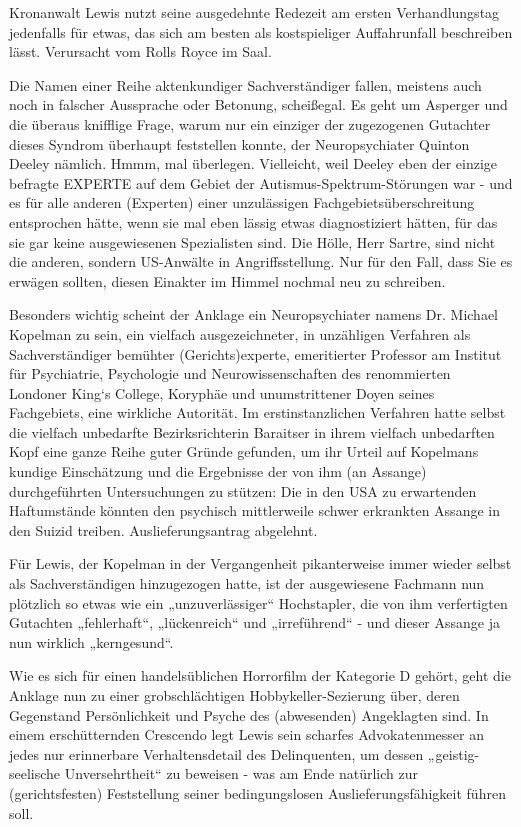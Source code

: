\begin{multicols}{2}
Kronanwalt Lewis nutzt seine ausgedehnte Redezeit am
ersten Verhandlungstag jedenfalls für etwas, das sich am
besten als kostspieliger Auffahrunfall beschreiben lässt.
Verursacht vom Rolls Royce im Saal.

Die Namen einer Reihe aktenkundiger Sachverständiger fallen, meistens auch noch in falscher Aussprache
oder Betonung, scheißegal. Es geht um Asperger und
die überaus knifflige Frage, warum nur ein einziger der
zugezogenen Gutachter dieses Syndrom überhaupt feststellen konnte, der Neuropsychiater Quinton Deeley
nämlich. Hmmm, mal überlegen. Vielleicht, weil Deeley
eben der einzige befragte EXPERTE auf dem Gebiet der
Autismus-Spektrum-Störungen war - und es für alle anderen (Experten) einer unzulässigen Fachgebietsüberschreitung entsprochen hätte, wenn sie mal eben lässig
etwas diagnostiziert hätten, für das sie gar keine ausgewiesenen Spezialisten sind. Die Hölle, Herr Sartre, sind
nicht die anderen, sondern US-Anwälte in Angriffsstellung. Nur für den Fall, dass Sie es erwägen sollten, diesen
Einakter im Himmel nochmal neu zu schreiben.

Besonders wichtig scheint der Anklage ein Neuropsychiater namens Dr. Michael Kopelman zu sein, ein vielfach ausgezeichneter, in unzähligen Verfahren als Sachverständiger bemühter (Gerichts)experte, emeritierter
Professor am Institut für Psychiatrie, Psychologie und
Neurowissenschaften des renommierten Londoner
King‘s College, Koryphäe und unumstrittener Doyen
seines Fachgebiets, eine wirkliche Autorität. Im erstinstanzlichen Verfahren hatte selbst die vielfach unbedarfte
Bezirksrichterin Baraitser in ihrem vielfach unbedarften
Kopf eine ganze Reihe guter Gründe gefunden, um ihr
Urteil auf Kopelmans kundige Einschätzung und die Ergebnisse der von ihm (an Assange) durchgeführten Untersuchungen zu stützen: Die in den USA zu erwartenden Haftumstände könnten den psychisch mittlerweile
schwer erkrankten Assange in den Suizid treiben. Auslieferungsantrag abgelehnt.

Für Lewis, der Kopelman in der Vergangenheit pikanterweise immer wieder selbst als Sachverständigen
hinzugezogen hatte, ist der ausgewiesene Fachmann
nun plötzlich so etwas wie ein „unzuverlässiger“ Hochstapler, die von ihm verfertigten Gutachten „fehlerhaft“,
„lückenreich“ und „irreführend“ - und dieser Assange ja
nun wirklich „kerngesund“.

Wie es sich für einen handelsüblichen Horrorfilm der
Kategorie D gehört, geht die Anklage nun zu einer grobschlächtigen Hobbykeller-Sezierung über, deren Gegenstand Persönlichkeit und Psyche des (abwesenden) Angeklagten sind. In einem erschütternden Crescendo legt
Lewis sein scharfes Advokatenmesser an jedes nur erinnerbare Verhaltensdetail des Delinquenten, um dessen
„geistig-seelische Unversehrtheit“ zu beweisen - was am
Ende natürlich zur (gerichtsfesten) Feststellung seiner
bedingungslosen Auslieferungsfähigkeit führen soll.


\end{multicols}
